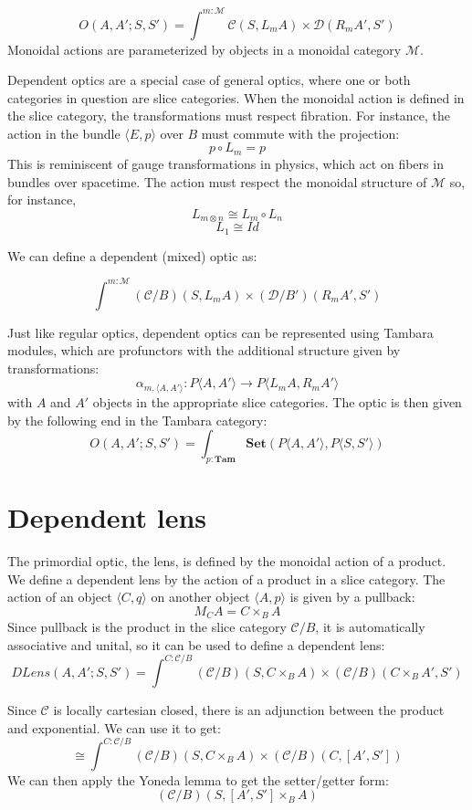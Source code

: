 \documentclass[11pt]{amsart}
\begin{document}
\[ O(A, A'; S, S') =  \int^{m \colon \mathcal{M}} \mathcal{C}( S, L_m A) \times \mathcal{D}(R_m A', S') \]
Monoidal actions are parameterized by objects in a monoidal category $\mathcal{M}$.

Dependent optics are a special case of general optics, where one or both categories in question are slice categories. When the monoidal action is defined in the slice category, the transformations must respect fibration. For instance, the action in the bundle $\langle E, p \rangle$ over $B$ must commute with the projection:
\[p \circ L_m = p \]
This is reminiscent of gauge transformations in physics, which act on fibers in bundles over spacetime. The action must respect the monoidal structure of $\mathcal{M}$ so, for instance,
\[L_{m \otimes n} \cong L_m \circ L_n \]
\[ L_1 \cong \mathit{Id} \]

We can define a dependent (mixed) optic as:

\[ \int^{m \colon \mathcal{M}} (\mathcal{C}/B)( S, L_m A) \times (\mathcal{D}/B')(R_m A', S') \]

Just like regular optics, dependent optics can be represented using Tambara modules, which are profunctors with the additional structure given by transformations:
\[ \alpha_{m, \langle A, A' \rangle} \colon P \langle A, A' \rangle \to P\langle L_m A, R_m A' \rangle \]
with $A$ and $A'$ objects in the appropriate slice categories.
The optic is then given by the following end in the Tambara category:
\[ O(A, A'; S, S') =  \int_{p \colon \mathbf{Tam}} \mathbf{Set}(P \langle A, A' \rangle, P \langle S, S' \rangle) \]


\section{Dependent lens}

The primordial optic, the lens, is defined by the monoidal action of a product. We define a dependent lens by the action of a product in a slice category. The action of an object $\langle C, q \rangle$ on another object $ \langle A, p \rangle$ is given by a pullback:
\[ M_C A = C \times_B A \]
Since pullback is the product in the slice category $\mathcal{C}/B$, it is automatically associative and unital, so it can be used to define a dependent lens:
\[ \mathit{DLens}(A, A'; S, S') = \int^{C \colon \mathcal{C}/B} (\mathcal{C}/B)( S, C \times_B A) \times (\mathcal{C}/B)(C \times_B A', S')\]


Since $\mathcal{C}$ is locally cartesian closed, there is an adjunction between the product and exponential. We can use it to get:
\[ \cong \int^{C \colon \mathcal{C}/B} (\mathcal{C}/B)( S, C \times_B A) \times (\mathcal{C}/B)(C , [A', S']) \]
We can then apply the Yoneda lemma to get the setter/getter form:
\[  (\mathcal{C}/B)( S, [A', S'] \times_B A) \]
\end{document}
